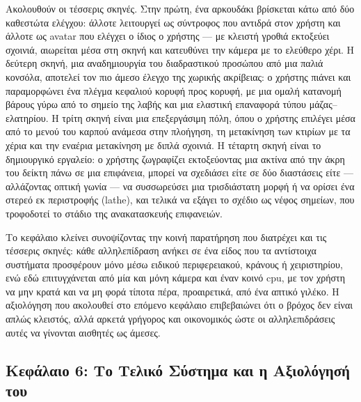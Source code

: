 Ακολουθούν οι τέσσερις σκηνές. Στην πρώτη, ένα αρκουδάκι βρίσκεται κάτω από δύο
καθεστώτα ελέγχου: άλλοτε λειτουργεί ως σύντροφος που αντιδρά στον χρήστη και
άλλοτε ως avatar που ελέγχει ο ίδιος ο χρήστης --- με κλειστή γροθιά εκτοξεύει
σχοινιά, αιωρείται μέσα στη σκηνή και κατευθύνει την κάμερα με το ελεύθερο
χέρι. Η δεύτερη σκηνή, μια αναδημιουργία του διαδραστικού προσώπου από μια
παλιά κονσόλα, αποτελεί τον πιο άμεσο έλεγχο της χωρικής ακρίβειας: ο χρήστης
πιάνει και παραμορφώνει ένα πλέγμα κεφαλιού κορυφή προς κορυφή, με μια ομαλή
κατανομή βάρους γύρω από το σημείο της λαβής και μια ελαστική επαναφορά τύπου
μάζας--ελατηρίου. Η τρίτη σκηνή είναι μια επεξεργάσιμη πόλη, όπου ο χρήστης
επιλέγει μέσα από το μενού του καρπού ανάμεσα στην πλοήγηση, τη μετακίνηση των
κτιρίων με τα χέρια και την εναέρια μετακίνηση με διπλά σχοινιά. Η τέταρτη
σκηνή είναι το δημιουργικό εργαλείο: ο χρήστης ζωγραφίζει εκτοξεύοντας μια
ακτίνα από την άκρη του δείκτη πάνω σε μια επιφάνεια, μπορεί να σχεδιάσει είτε
σε δύο διαστάσεις είτε --- αλλάζοντας οπτική γωνία --- να συσσωρεύσει μια
τρισδιάστατη μορφή ή να ορίσει ένα στερεό εκ περιστροφής (lathe), και τελικά να
εξάγει το σχέδιο ως νέφος σημείων, που τροφοδοτεί το στάδιο της ανακατασκευής
επιφανειών.

Το κεφάλαιο κλείνει συνοψίζοντας την κοινή παρατήρηση που διατρέχει και
τις τέσσερις σκηνές: κάθε αλληλεπίδραση ανήκει σε ένα είδος που τα
αντίστοιχα συστήματα προσφέρουν μόνο μέσω ειδικού περιφερειακού, κράνους ή
χειριστηρίου, ενώ εδώ επιτυγχάνεται από μία και μόνη κάμερα και έναν κοινό
\acrshort{cpu}, με τον χρήστη να μην κρατά και να μη φορά τίποτα πέρα,
προαιρετικά, από ένα απτικό γιλέκο. Η αξιολόγηση που ακολουθεί στο επόμενο
κεφάλαιο επιβεβαιώνει ότι ο βρόχος δεν είναι απλώς κλειστός, αλλά αρκετά
γρήγορος και οικονομικός ώστε οι αλληλεπιδράσεις αυτές να γίνονται αισθητές
ως άμεσες.



\subsection*{Κεφάλαιο 6: Το Τελικό Σύστημα και η Αξιολόγησή του}

